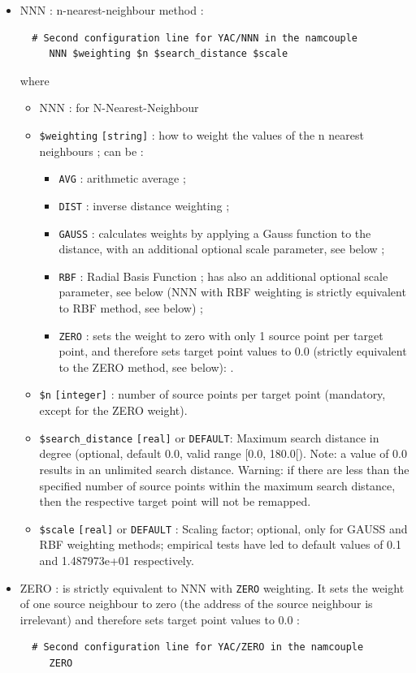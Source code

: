  \begin{itemize}
 \item NNN : n-nearest-neighbour method :
 \begin{verbatim}
  # Second configuration line for YAC/NNN in the namcouple
     NNN $weighting $n $search_distance $scale
\end{verbatim} 
where
\begin{itemize}
\item NNN : for N-Nearest-Neighbour 
\item {\tt \$weighting} {\tt [string]} : how to weight the values of the n nearest neighbours ; can be :
   \begin{itemize}
   \item {\tt AVG} : arithmetic average ;
   \item {\tt DIST} : inverse distance weighting ;
   \item {\tt GAUSS} : calculates weights by applying a Gauss function to the distance, with an additional optional scale parameter, see below ;
   \item {\tt RBF} : Radial Basis Function ; has also an additional optional scale parameter, see below (NNN with RBF weighting is strictly equivalent to RBF method, see below) ;
   \item {\tt ZERO} : sets the weight to zero with only 1 source point per target point, and therefore sets target point values to 0.0 (strictly equivalent to the ZERO method, see below):  .
   \end{itemize} 
\item {\tt \$n} {\tt [integer]} : number of source points per target point (mandatory, except for the ZERO weight).
\item {\tt \$search\_distance} {\tt [real]} or {\tt DEFAULT}: Maximum search distance in degree (optional, default 0.0, valid range [0.0, 180.0[). Note: a value of 0.0 results in an unlimited search distance. Warning: if there are less than the specified number of source points within the maximum
search distance, then the respective target point will not be remapped.
\item {\tt \$scale} {\tt [real]} or {\tt DEFAULT} : Scaling factor; optional, only for GAUSS and RBF weighting methods; empirical tests have led to default values of 0.1 and 1.487973e+01 respectively.
\end{itemize}

\item ZERO :  is strictly equivalent to NNN with {\tt ZERO} weighting. It sets
the weight of one source neighbour to zero (the address of the source neighbour is 
irrelevant) and therefore sets target point values to 0.0 :
\begin{verbatim}
  # Second configuration line for YAC/ZERO in the namcouple
     ZERO  
\end{verbatim}


\end{itemize}
